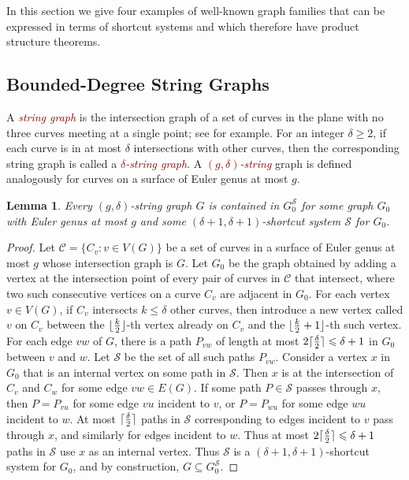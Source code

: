 \documentclass{patmorin}
\theoremstyle{plain}
\newtheorem{lem}[thm]{Lemma}
\theoremstyle{definition}
\newcommand{\defin}[1]{\textcolor{Maroon}{\emph{#1}}}
\DeclarePairedDelimiter{\ceil}{\lceil}{\rceil}
\DeclarePairedDelimiter{\floor}{\lfloor}{\rfloor}
\renewcommand{\SS}{\mathcal{S}}
\renewcommand{\geq}{\geqslant}
\renewcommand{\leq}{\leqslant}
\begin{document}
In this section we give four examples of well-known graph families that can be expressed in terms of shortcut systems and which therefore have product structure theorems.


\subsection{Bounded-Degree String Graphs}
\label{first_example}

A \defin{string graph} is the intersection graph of a set of curves in the plane with no three curves meeting at a single point; see  \cite{PachToth-DCG02,FP10,FP14} for example. For an integer $\delta\geq 2$, if each curve is in at most $\delta$ intersections with other curves, then the corresponding string graph is called a \defin{$\delta$-string graph}. A \defin{$(g,\delta)$-string} graph is defined analogously for curves on a surface of Euler genus at most $g$.

\begin{lem}
\label{StringShortcut}
Every $(g,\delta)$-string graph $G$ is contained in $G_0^\SS$ for some graph $G_0$ with Euler genus at most $g$ and some $(\delta+1,\delta+1 )$-shortcut system $\SS$ for $G_0$.
\end{lem}

\begin{proof}
Let $\mathcal{C}=\{C_v:v\in V(G)\}$ be a set of curves in a surface of Euler genus at most $g$ whose intersection graph is $G$.  Let $G_0$ be the graph obtained by adding a vertex at the intersection point of every pair of curves in $\mathcal{C}$ that intersect,  where two such consecutive vertices on a curve $C_v$ are adjacent in $G_0$. For each vertex $v\in V(G)$, if $C_v$ intersects $k\leq\delta$ other curves, then introduce a new vertex called $v$ on $C_v$ between the
$\floor{\frac{k}{2}}$-th vertex already on $C_v$ and the $\floor{\frac{k}{2}+1}$-th such vertex. For each edge $vw$ of $G$, there is a path $P_{vw}$ of length at most $2\ceil{\frac{\delta}{2}}\leq \delta+1$ in $G_0$ between $v$ and $w$. Let $\SS$ be the set of all such paths $P_{vw}$. Consider a vertex $x$ in $G_0$ that is an internal vertex on some path in $\SS$. Then $x$ is at the intersection of $C_v$ and $C_w$ for some edge $vw\in E(G)$. If some path $P\in \SS$ passes through $x$, then $P=P_{vu}$ for some edge $vu$ incident to $v$, or $P=P_{wu}$ for some edge $wu$ incident to $w$. At most $\ceil{\frac{\delta}{2}}$ paths in $\SS$ corresponding to edges incident to $v$ pass through $x$, and similarly for edges incident to $w$. Thus at most $2\ceil{\frac{\delta}{2}}\leq\delta+1$ paths in $\SS$ use $x$ as an internal vertex. Thus $\SS$ is a $(\delta+1,\delta+1)$-shortcut system for $G_0$, and by construction, $G \subseteq G_0^\SS$.
\end{proof}
\end{document}
